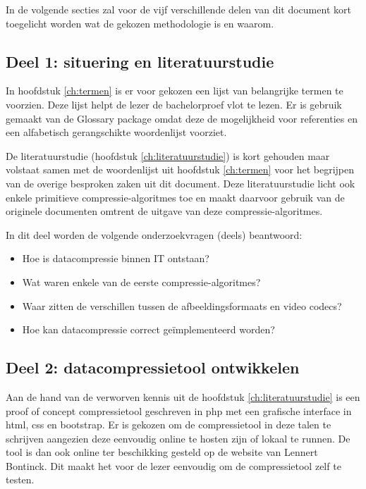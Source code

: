 In de volgende secties zal voor de vijf verschillende delen van dit document kort toegelicht worden wat de gekozen methodologie is en waarom.

\subsection{Deel 1: situering en literatuurstudie}
\label{sec:aanpak-bachelorproef-deel-1}

In hoofdstuk \ref{ch:termen} is er voor gekozen een lijst van belangrijke termen te voorzien. Deze lijst helpt de lezer de bachelorproef vlot te lezen. Er is gebruik gemaakt van de Glossary package omdat deze de mogelijkheid voor referenties en een alfabetisch gerangschikte woordenlijst voorziet.

De literatuurstudie (hoofdstuk \ref{ch:literatuurstudie}) is kort gehouden maar volstaat samen met de woordenlijst uit hoofdstuk \ref{ch:termen} voor het begrijpen van de overige besproken zaken uit dit document. Deze literatuurstudie licht ook enkele primitieve \glspl{compressie-algoritme} toe en maakt daarvoor gebruik van de originele documenten omtrent de uitgave van deze \glspl{compressie-algoritme}. 

In dit deel worden de volgende onderzoekvragen (deels) beantwoord: 
\begin{itemize}
	\item Hoe is \gls{datacompressie} binnen IT ontstaan?
	\item Wat waren enkele van de eerste \glspl{compressie-algoritme}?
	\item Waar zitten de verschillen tussen de \glspl{afbeeldingsformaat} en video \glspl{codec}?
	\item Hoe kan \gls{datacompressie} correct geïmplementeerd worden?
\end{itemize}

\subsection{Deel 2: datacompressietool ontwikkelen}
\label{sec:aanpak-bachelorproef-deel-2}

Aan de hand van de verworven kennis uit de hoofdstuk \ref{ch:literatuurstudie} is een proof of concept \gls{compressietool} geschreven in \gls{php} met een grafische interface in \gls{html}, \gls{css} en \gls{bootstrap}. Er is gekozen om de \gls{compressietool} in deze talen te schrijven aangezien deze eenvoudig online te hosten zijn of lokaal te runnen. De tool is dan ook online ter beschikking gesteld op de website van Lennert Bontinck. Dit maakt het voor de lezer eenvoudig om de \gls{compressietool} zelf te testen.

